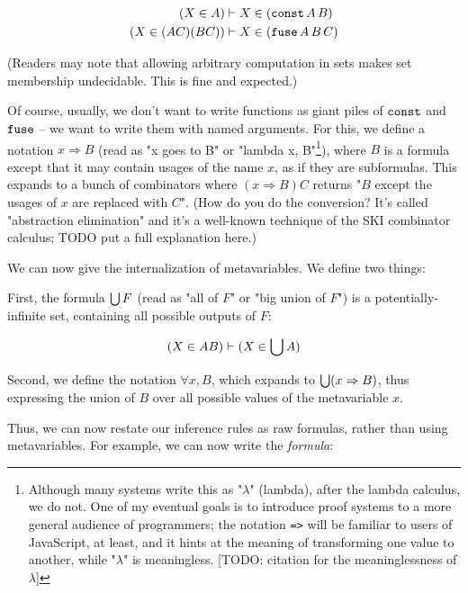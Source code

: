 \documentclass{article}
\begin{document}
  \begin{align*}
    (X \in A) &\vdash X \in (\operatorname{\texttt{const}} A\, B)\\
    (X \in (AC)(BC)) &\vdash X \in (\operatorname{\texttt{fuse}} A\, B\, C)\\
  \end{align*}
  
  (Readers may note that allowing arbitrary computation in sets makes set membership undecidable. This is fine and expected.)

  \newcommand{\nameabst}[1]{#1 \Rightarrow}
  
  Of course, usually, we don't want to write functions as giant piles of $\operatorname{\texttt{const}}$ and $\operatorname{\texttt{fuse}}$ – we want to write them with named arguments. For this, we define a notation $\nameabst{x} B$ (read as "x goes to B" or "lambda x, B"\footnote{Although many systems write this as "$\lambda$" (lambda), after the lambda calculus, we do not. One of my eventual goals is to introduce proof systems to a more general audience of programmers; the notation \texttt{=>} will be familiar to users of JavaScript, at least, and it hints at the meaning of transforming one value to another, while "$\lambda$" is meaningless. [TODO: citation for the meaninglessness of $\lambda$]}), where $B$ is a formula except that it may contain usages of the name $x$, as if they are subformulas. This expands to a bunch of combinators where $(\nameabst{x} B) C$ returns "$B$ except the usages of $x$ are replaced with $C$". (How do you do the conversion? It's called "abstraction elimination" and it's a well-known technique of the SKI combinator calculus; TODO put a full explanation here.)
  
  We can now give the internalization of metavariables. We define two things:
  
  First, the formula $\bigcup F$ (read as "all of $F$" or "big union of $F$") is a potentially-infinite set, containing all possible outputs of $F$:
  
  \begin{align*}
    (X \in AB) &\vdash (X \in \bigcup A) \\
  \end{align*}
  
  Second, we define the notation $\forall x, B$, which expands to $\all (\nameabst{x} B)$, thus expressing the union of $B$ over all possible values of the metavariable $x$.
  
  Thus, we can now restate our inference rules as raw formulas, rather than using metavariables. For example, we can now write the \emph{formula}:
  
\end{document}
